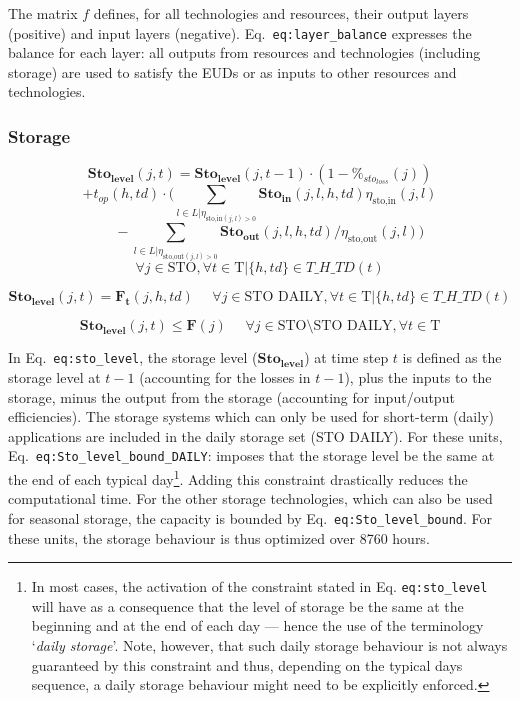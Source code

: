 \documentclass[
]{article}
\begin{document}
The matrix \(f\) defines, for all technologies and resources, their
output layers (positive) and input layers (negative).
Eq.~\texttt{eq:layer\_balance} expresses the balance for each layer: all
outputs from resources and technologies (including storage) are used to
satisfy the EUDs or as inputs to other resources and technologies.

\subsubsection{Storage}\label{storage}

{\[\textbf{Sto}_\textbf{level} (j,t) =    \textbf{Sto}_\textbf{level} (j,t-1)\cdot\left(1 - \%_{sto_{loss}}(j) \right)\]\[+ t_{op} (h,td)\cdot \Big(\sum_{l \in L | \eta_{\text{sto,in} (j,l) > 0}} \textbf{Sto}_\textbf{in}  (j,l,h,td) \eta_{\text{sto,in}} (j,l)\]\[~~~~~~ - \sum_{l \in L | \eta_{\text{sto,out} (j,l) > 0}} \textbf{Sto}_\textbf{out} (j,l,h,td) /  \eta_{\text{sto,out}} (j,l)\Big)\]\[\forall j \in \text{STO}, \forall t \in \text{T}| \{h,td\} \in T\_H\_TD(t)\]}

{\[\textbf{Sto}_\textbf{level} (j,t) = \textbf{F}_\textbf{t} (j,h,td) ~~~~~~ \forall j \in \text{STO DAILY},\forall t \in \text{T}| \{h,td\} \in T\_H\_TD(t)\]}

{\[\textbf{Sto}_\textbf{level} (j,t) \leq \textbf{F} (j) ~~~~~~ \forall j \in \text{STO} \setminus \text{STO DAILY},\forall t \in \text{T}\]}

In Eq.~\texttt{eq:sto\_level}, the storage level
(\(\textbf{Sto}_{\textbf{level}}\)) at time step \(t\) is defined as the
storage level at \(t-1\) (accounting for the losses in \(t-1\)), plus
the inputs to the storage, minus the output from the storage (accounting
for input/output efficiencies). The storage systems which can only be
used for short-term (daily) applications are included in the daily
storage set (STO DAILY). For these units,
Eq.~\texttt{eq:Sto\_level\_bound\_DAILY}: imposes that the storage level
be the same at the end of each typical day\footnote{In most cases, the
  activation of the constraint stated in Eq. \texttt{eq:sto\_level} will
  have as a consequence that the level of storage be the same at the
  beginning and at the end of each day --- hence the use of the
  terminology `\emph{daily storage}'. Note, however, that such daily
  storage behaviour is not always guaranteed by this constraint and
  thus, depending on the typical days sequence, a daily storage
  behaviour might need to be explicitly enforced.}. Adding this
constraint drastically reduces the computational time. For the other
storage technologies, which can also be used for seasonal storage, the
capacity is bounded by Eq.~\texttt{eq:Sto\_level\_bound}. For these
units, the storage behaviour is thus optimized over 8760 hours.
\end{document}
